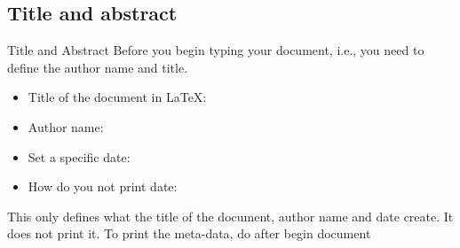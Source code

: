 \documentclass[10pt,times]{beamer}
\begin{document}
\subsection{Title and abstract}
\begin{frame}{Title and Abstract}
Before you begin typing your document, i.e.,  you need 
to define the author name and title.
\begin{itemize}
\item Title of the document in \LaTeX: 
\item Author name: 
\item Set a specific date: 
\item How do you not print date: 
\end{itemize}
\centering
This only defines what the title of the document, author name and date create. 
It does not print it. To print the meta-data, do  after begin 
document
\end{frame}

\end{document}
